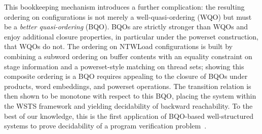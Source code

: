 This bookkeeping mechanism introduces a further complication: the resulting
ordering on configurations is not merely a well-quasi-ordering (WQO) but
must be a \emph{better quasi-ordering} (BQO). BQOs are strictly stronger
than WQOs and enjoy additional closure properties, in particular under the
powerset construction, that WQOs do not. The ordering on NTWLoad
configurations is built by combining a subword ordering on buffer contents
with an equality constraint on stage information and a powerset-style matching
on thread sets; showing this composite ordering is a BQO requires appealing to
the closure of BQOs under products, word embeddings, and powerset operations.
The transition relation is then shown to be monotone with respect to this BQO,
placing the system within the WSTS framework and yielding decidability of
backward reachability. To the best of our knowledge, this is the first
application of BQO-based well-structured systems to prove decidability of a
program verification problem~\cite{eTSO_param}.
